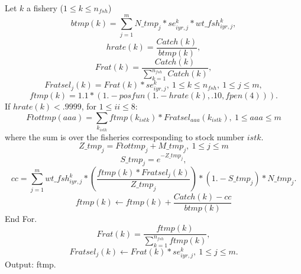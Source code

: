 \documentclass{article}
\begin{document}
Let $k$ a fishery ($1\leq k \leq n_{fsh}$)
\begin{equation}
    btmp(k)  =  \sum_{j=1}^mN\_tmp_j * se^k_{iyr,j} * wt\_fsh^k_{iyr,j},
\end{equation}
\begin{equation}
    hrate(k) = \dfrac{Catch(k)}{btmp(k)},
\end{equation}
\begin{equation}
    Frat(k)  = \dfrac{Catch(k)}{\sum_{k=1}^{n_{fsh}} Catch(k)},
\end{equation}
\begin{equation}
    Fratsel_j(k) = Frat(k)*se^k_{iyr,j}, \ 1\leq k \leq n_{fsh}, \ 1\leq j \leq m,
\end{equation}
\begin{equation}
    ftmp(k) = 1.1*(1.- posfun(1.-hrate(k),.10,fpen(4))).
\end{equation}
If $hrate(k)<.9999$, for $1\leq ii \leq 8$:
\begin{equation}
    Ftottmp(aaa)=\sum_{k_{istk}}ftmp(k_{istk})*Fratsel_{aaa}(k_{istk}), \ 1\leq aaa \leq m
\end{equation}
where the sum is over the fisheries corresponding to stock number $istk$.
\begin{equation}
    Z\_tmp_j     = Ftottmp_j  + M\_tmp_j, \ 1\leq j \leq m
\end{equation}
\begin{equation}
    S\_tmp_j     = e^{ -Z\_tmp_j },
\end{equation}
\begin{equation}
    cc = \sum_{j=1}^m wt\_fsh^k_{iyr,j} * \left(\dfrac{ftmp(k)*Fratsel_j(k)}{  Z\_tmp_j}\right)*(1.-S\_tmp_j)*N\_tmp_j.
\end{equation}
\begin{equation}
    ftmp(k) \leftarrow ftmp(k) + \dfrac{Catch(k)-cc}{btmp(k)}
\end{equation}
End For.
\begin{equation}
    Frat(k)=\dfrac{ftmp(k)}{\sum_{k=1}^{n_{fsh}}ftmp(k)},
\end{equation}
\begin{equation}
    Fratsel_j(k)\leftarrow Frat(k)*se^k_{iyr,j}, \ 1\leq j \leq m.
\end{equation}
Output: ftmp.\\

\end{document}

